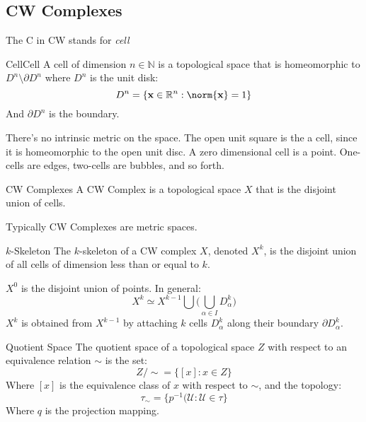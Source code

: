     \subsection{CW Complexes}
        The C in CW stands for \textit{cell}
        \begin{ldefinition}{Cell}{Cell}
            A cell of dimension $n\in\mathbb{N}$ is a topological space that is
            homeomorphic to $D^{n}\setminus\partial{D}^{n}$ where $D^{n}$ is the
            unit disk:
            \begin{equation}
                D^{n}=\{\mathbf{x}\in\mathbb{R}^{n}:\norm{\mathbf{x}}=1\}
            \end{equation}
            And $\partial{D}^{n}$ is the boundary.
        \end{ldefinition}
        There's no intrinsic metric on the space.
        The open unit square is the a cell, since
        it is homeomorphic to the open unit disc.
        A zero dimensional cell is a point.
        One-cells are edges, two-cells are
        bubbles, and so forth.
        \begin{ldefinition}{CW Complexes}
            A CW Complex is a topological space $X$ that is the disjoint union
            of cells.
        \end{ldefinition}
        Typically CW Complexes are metric spaces.
        \begin{ldefinition}{$k$-Skeleton}
            The $k$-skeleton of a CW complex $X$, denoted $X^{k}$, is the
            disjoint union of all cells of dimension less than or equal to $k$.
        \end{ldefinition}
        $X^{0}$ is the disjoint union of points. In general:
        \begin{equation}
            X^{k}\simeq{X}^{k-1}\bigcup
                \Big(\bigcup_{\alpha\in{I}}D_{\alpha}^{k}\Big)
        \end{equation}
        $X^{k}$ is obtained from $X^{k-1}$ by attaching $k$ cells
        $D_{\alpha}^{k}$ along their boundary $\partial{D}_{\alpha}^{k}$.
        \begin{ldefinition}{Quotient Space}
            The quotient space of a topological space $Z$ with respect to an
            equivalence relation $\sim$ is the set:
            \begin{equation}
                Z/\sim=\{[x]:x\in{Z}\}
            \end{equation}
            Where $[x]$ is the equivalence class of $x$ with respect to $\sim$,
            and the topology:
            \begin{equation}
                \tau_{\sim}=\{p^{-1}(\mathcal{U}:\mathcal{U}\in\tau\}
            \end{equation}
            Where $q$ is the projection mapping.
        \end{ldefinition}
